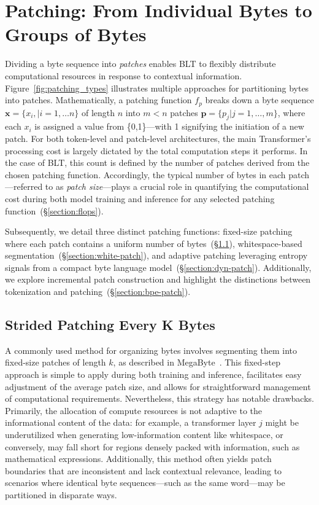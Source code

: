 \section{Patching: From Individual Bytes to Groups of Bytes}
\label{section:patching}

Dividing a byte sequence into \textit{patches} enables {\textsc BLT} to flexibly distribute computational resources in response to contextual information. Figure~\ref{fig:patching_types} illustrates multiple approaches for partitioning bytes into patches. Mathematically, a patching function $f_p$ breaks down a byte sequence $\pmb{x}=\{x_i,|i=1,\ldots n\}$ of length $n$ into $m < n$ patches $\pmb{p}=\{p_j|j=1,\ldots,m\}$, where each $x_i$ is assigned a value from \{0,1\}—with 1 signifying the initiation of a new patch. For both token-level and patch-level architectures, the main Transformer’s processing cost is largely dictated by the total computation steps it performs. In the case of {\textsc BLT}, this count is defined by the number of patches derived from the chosen patching function. Accordingly, the typical number of bytes in each patch—referred to as \textit{patch size}—plays a crucial role in quantifying the computational cost during both model training and inference for any selected patching function~(\S\ref{section:flops}).

Subsequently, we detail three distinct patching functions: fixed-size patching where each patch contains a uniform number of bytes~(\S\ref{section:static-patch}), whitespace-based segmentation~(\S\ref{section:white-patch}), and adaptive patching leveraging entropy signals from a compact byte language model~(\S\ref{section:dyn-patch}). Additionally, we explore incremental patch construction and highlight the distinctions between tokenization and patching~(\S\ref{section:bpe-patch}).

\subsection{Strided Patching Every K Bytes}
\label{section:static-patch}

A commonly used method for organizing bytes involves segmenting them into fixed-size patches of length $k$, as described in MegaByte~\citep{yu2023megabyte}. This fixed-step approach is simple to apply during both training and inference, facilitates easy adjustment of the average patch size, and allows for straightforward management of computational requirements. Nevertheless, this strategy has notable drawbacks. Primarily, the allocation of compute resources is not adaptive to the informational content of the data: for example, a transformer layer $j$ might be underutilized when generating low-information content like whitespace, or conversely, may fall short for regions densely packed with information, such as mathematical expressions. Additionally, this method often yields patch boundaries that are inconsistent and lack contextual relevance, leading to scenarios where identical byte sequences—such as the same word—may be partitioned in disparate ways.

